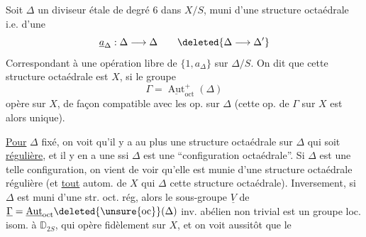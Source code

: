 Soit $\Delta$ un diviseur étale de degré $6$ dans $X/S$, muni d'une structure octaédrale i.e. d'une   
\[
\underline a_\Delta:\Delta\longrightarrow\Delta
\qquad\deleted{\Delta\longrightarrow\Delta'}
\]
Correspondant à une opération libre de $\{1,a_\Delta\}$ sur $\Delta/S$. On dit que cette structure octaédrale est   $X$, si le groupe
\[
\Gamma=\underline{\operatorname{Aut}}^+_{\mathrm{oct}}(\Delta)
\]
opère sur $X$, de façon compatible avec les op. sur $\Delta$ (cette op. de $\Gamma$ sur $X$ est alors unique).


\uline{Pour} $\Delta$  fixé, on voit qu'il y a au plus une structure octaédrale sur $\Delta$ qui soit \uline{régulière}, et il y en a une ssi $\Delta$ est une ``configuration octaédrale''. Si $\Delta$ est une telle configuration, on vient de voir  qu'elle est munie d'une  structure octaédrale régulière (et \uline{tout} autom. de $X$ qui   $\Delta$   cette structure octaédrale). Inversement, si $\Delta$ est muni d'une str. oct. rég, alors le sous-groupe $\underline V$ de $\underline\Gamma=\underline{\operatorname{Aut}}_{\mathrm{oct}}\deleted{\unsure{\mathrm{oc}}}(\Delta)$ inv. abélien non trivial est un groupe loc. isom. à $\mathbb D_{2S}$, qui opère fidèlement sur $X$, et on voit aussitôt que le

